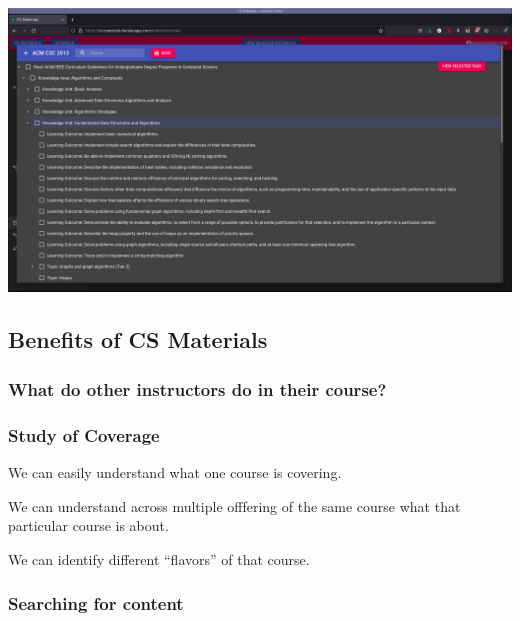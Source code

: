 \documentclass[aspectratio=169]{beamer}
\begin{document}
\begin{frame}
  \includegraphics[width=\linewidth]{structure_figs/csmat4.png}
\end{frame}

\subsection{Benefits of CS Materials}


\subsubsection{What do other instructors do in their course?}


\begin{frame}
  \frametitle{Study of Coverage}

  We can easily understand what one course is covering.

  We can understand across multiple offfering of the same course what that particular course is about.

  We can identify different ``flavors'' of that course.  
\end{frame}



\subsubsection{Searching for content}
\end{document}

